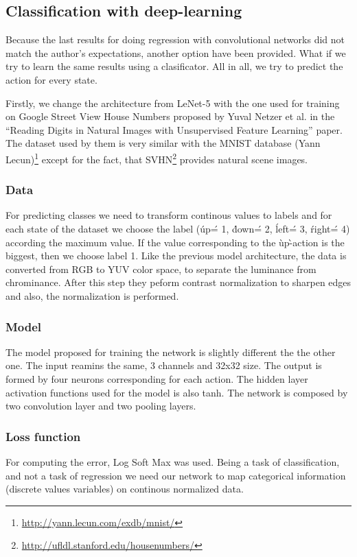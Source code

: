 \subsection{Classification with deep-learning}

Because the last results for doing regression with convolutional networks did not match the author's expectations, another option have been provided. What if we try to learn the same results using a clasificator. All in all, we try to predict the action for every state.

Firstly, we change the architecture from LeNet-5 with the one used for training on Google Street View House Numbers proposed by Yuval Netzer et al. in the ``Reading Digits in Natural Images with Unsupervised Feature Learning''\cite{svhn} paper. The dataset used by them is very similar with the MNIST database (Yann Lecun)\footnote{\url{http://yann.lecun.com/exdb/mnist/}} except for the fact, that SVHN\footnote{\url{http://ufldl.stanford.edu/housenumbers/}} provides natural scene images.

\subsubsection{Data}
For predicting classes we need to transform continous values to labels and for each state of the dataset we choose the label (\'up\' = 1, \'down\' = 2, \'left\' = 3, \'right\' = 4) according the maximum value. If the value corresponding to the \`up\`-action is the biggest, then we choose label 1.
Like the previous model architecture, the data is converted from RGB to YUV color space, to separate the luminance from chrominance. After this step they peform contrast normalization to sharpen edges and also, the normalization is performed.

\subsubsection{Model}
The model proposed for training the network is slightly different the the other one. The input reamins the same, 3 channels and 32x32 size. The output is formed by four neurons corresponding for each action. The hidden layer activation functions used for the model is also tanh. The network is composed by two convolution layer and two pooling layers.

\subsubsection{Loss function}
For computing the error, Log Soft Max was used. Being a task of classification, and not a task of regression we need our network to map categorical information (discrete values variables) on continous normalized data.

